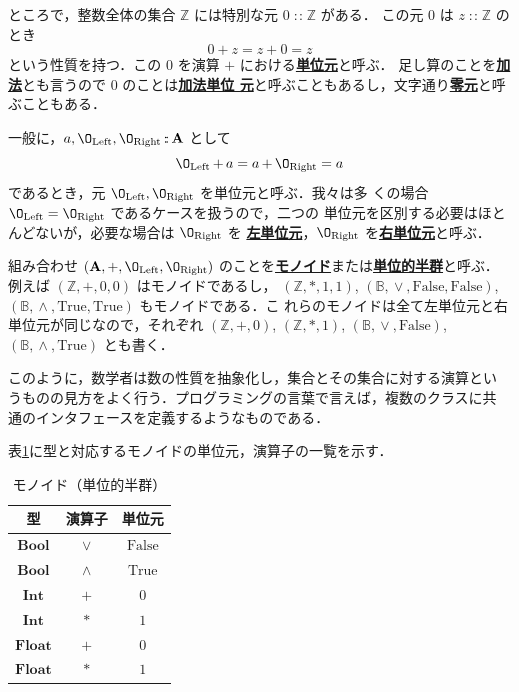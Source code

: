 \documentclass[a5paper,twoside,fleqn,draft]{jsbook}
\newcommand{\keyword}[1]{{\underline{\textbf{#1}}}}
\newcommand{\mSpecialConstant}[1]{\textrm{#1}}
\newcommand{\mFalse}{\mSpecialConstant{False}}
\newcommand{\mTrue}{\mSpecialConstant{True}}
\newcommand{\mZero}{\O}
\DeclareMathOperator{\mIn}{{:\!:}}
\DeclareMathOperator{\mLogicalAnd}{\wedge}
\DeclareMathOperator{\mLogicalOr}{\vee}
\DeclareMathOperator{\mPlus}{\boldmath{+}} %
\newcommand{\mSpecialSub}[1]{\text{#1}}
\newcommand{\mLeft}{\mSpecialSub{Left}}
\newcommand{\mRight}{\mSpecialSub{Right}}
\newcommand{\mSet}[1]{\mathbf{#1}}
\newcommand{\mSpecialSet}[1]{\mathbb{#1}}
\newcommand{\mBSet}{\mSpecialSet{B}}
\newcommand{\mZSet}{\mSpecialSet{Z}}
\newcommand{\mType}[1]{\mathbf{#1}} %
\newcommand{\mBoolType}{\mType{Bool}}
\newcommand{\mFloatType}{\mType{Float}}
\newcommand{\mIntType}{\mType{Int}}
\newcommand{\mTupleWith}[1]{\left(#1\right)} %
\begin{document}
ところで，整数全体の集合 $\mZSet$ には特別な元 $0\mIn\mZSet$ がある．
この元 $0$ は $z\mIn\mZSet$ のとき
\begin{equation}
  0+z
  =z+0
  =z
\end{equation}
という性質を持つ．この $0$ を演算 $+$ における\keyword{単位元}と呼ぶ．
足し算のことを\keyword{加法}とも言うので $0$ のことは\keyword{加法単位
  元}と呼ぶこともあるし，文字通り\keyword{零元}と呼ぶこともある．

一般に，$a,\mZero_\mLeft,\mZero_\mRight\mIn\mSet{A}$ として
\begin{equation}
  \label{eq:identity}
  \mZero_\mLeft\mPlus a
  =a\mPlus\mZero_\mRight
  =a
\end{equation}
であるとき，元 $\mZero_\mLeft,\mZero_\mRight$ を単位元と呼ぶ．我々は多
くの場合 $\mZero_\mLeft=\mZero_\mRight$ であるケースを扱うので，二つの
単位元を区別する必要はほとんどないが，必要な場合は $\mZero_\mRight$ を
\keyword{左単位元}，$\mZero_\mRight$ を\keyword{右単位元}と呼ぶ．

組み合わせ $\mTupleWith{\mSet{A},\mPlus,\mZero_\mLeft,\mZero_\mRight}$
のことを\keyword{モノイド}または\keyword{単位的半群}と呼ぶ．例えば
$\mTupleWith{\mZSet,+,0,0}$ はモノイドであるし，
$\mTupleWith{\mZSet,*,1,1}$,
$\mTupleWith{\mBSet,\mLogicalOr,\mFalse,\mFalse}$,
$\mTupleWith{\mBSet,\mLogicalAnd,\mTrue,\mTrue}$ もモノイドである．こ
れらのモノイドは全て左単位元と右単位元が同じなので，それぞれ
$\mTupleWith{\mZSet,+,0}$, $\mTupleWith{\mZSet,*,1}$,
$\mTupleWith{\mBSet,\mLogicalOr,\mFalse}$,
$\mTupleWith{\mBSet,\mLogicalAnd,\mTrue}$ とも書く．

このように，数学者は数の性質を抽象化し，集合とその集合に対する演算とい
うものの見方をよく行う．プログラミングの言葉で言えば，複数のクラスに共
通のインタフェースを定義するようなものである．

表\ref{tab:monoids}に型と対応するモノイドの単位元，演算子の一覧を示す．

\begin{table}
\caption{モノイド（単位的半群）}
\label{tab:monoids}
\begin{center}
\begin{tabular}{||c||c|c||}
\hline 型&演算子&単位元\\ \hline\hline $\mBoolType$ &$\vee$
&$\mFalse$\\ \hline $\mBoolType$ &$\wedge$ &$\mTrue$\\ \hline
$\mIntType$ &$+$ &$0$\\ \hline $\mIntType$ &$*$ &$1$\\ \hline
$\mFloatType$ &$+$ &$0$\\ \hline $\mFloatType$ &$*$ &$1$\\ \hline
\end{tabular}
\end{center}
\end{table}
\end{document}
